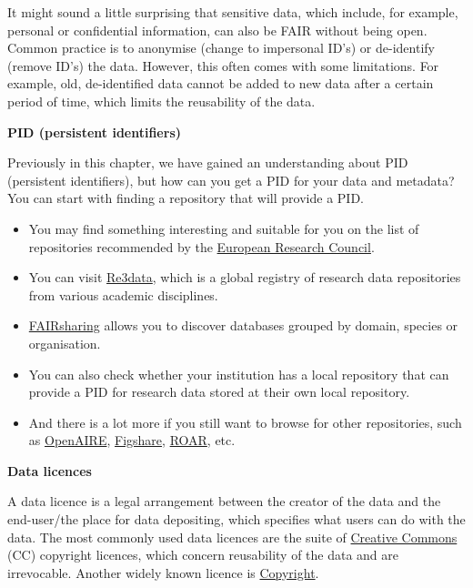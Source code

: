 \documentclass[
]{book}
\providecommand{\tightlist}{%
  \setlength{\itemsep}{0pt}\setlength{\parskip}{0pt}}
\begin{document}
It might sound a little surprising that sensitive data, which include, for example, personal or confidential information, can also be FAIR without being open. Common practice is to anonymise (change to impersonal ID's) or de-identify (remove ID's) the data. However, this often comes with some limitations. For example, old, de-identified data cannot be added to new data after a certain period of time, which limits the reusability of the data.

\textbf{PID (persistent identifiers)}

Previously in this chapter, we have gained an understanding about PID (persistent identifiers), but how can you get a PID for your data and metadata? You can start with finding a repository that will provide a PID.

\begin{itemize}
\tightlist
\item
  You may find something interesting and suitable for you on the list of repositories recommended by the \href{https://erc.europa.eu/funding-and-grants/managing-project/open-access}{European Research Council}.
\item
  You can visit \href{https://www.re3data.org/}{Re3data}, which is a global registry of research data repositories from various academic disciplines.
\item
  \href{https://fairsharing.org/search?fairsharingRegistry=Database}{FAIRsharing} allows you to discover databases grouped by domain, species or organisation.
\item
  You can also check whether your institution has a local repository that can provide a PID for research data stored at their own local repository.
\item
  And there is a lot more if you still want to browse for other repositories, such as \href{https://explore.openaire.eu/participate/deposit/learn-how}{OpenAIRE}, \href{https://figshare.com/}{Figshare}, \href{http://roar.eprints.org/}{ROAR}, etc.
\end{itemize}

\textbf{Data licences}

A data licence is a legal arrangement between the creator of the data and the end-user/the place for data depositing, which specifies what users can do with the data. The most commonly used data licences are the suite of \href{https://en.wikipedia.org/wiki/Creative_Commons}{Creative Commons} (CC) copyright licences, which concern reusability of the data and are irrevocable. Another widely known licence is \href{https://en.wikipedia.org/wiki/Copyright}{Copyright}.
\end{document}
